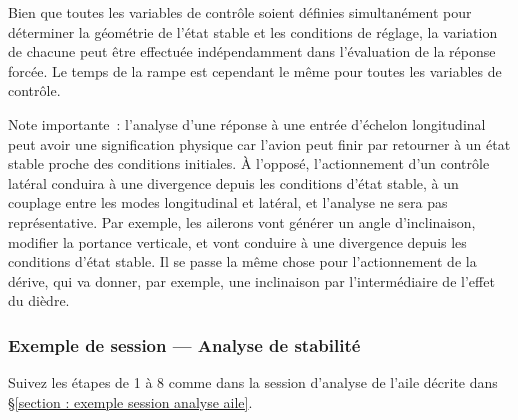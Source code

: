 \documentclass[a4paper,twoside,12pt,dvips]{article}
\begin{document}
Bien que toutes les variables de contrôle soient définies simultanément pour déterminer la géométrie de l’état stable et les conditions de réglage, la variation de chacune peut être effectuée indépendamment dans l’évaluation de la réponse forcée. Le temps de la rampe est cependant le même pour toutes les variables de contrôle.

Note importante~: l’analyse d’une réponse à une entrée d’échelon longitudinal peut avoir une signification physique car l’avion peut finir par retourner à un état stable proche des conditions initiales. À l’opposé, l’actionnement d’un contrôle latéral conduira à une divergence depuis les conditions d’état stable, à un couplage entre les modes longitudinal et latéral, et l’analyse ne sera pas représentative. Par exemple, les ailerons vont générer un angle d’inclinaison, modifier la portance verticale, et vont conduire à une divergence depuis les conditions d’état stable. Il se passe la même chose pour l’actionnement de la dérive, qui va donner, par exemple, une inclinaison par l’intermédiaire de l’effet du dièdre.

\subsubsection{Exemple de session — Analyse de stabilité}

Suivez les étapes de 1 à 8 comme dans la session d’analyse de l’aile décrite 
dans \S\ref{section : exemple session analyse aile}.
\end{document}
